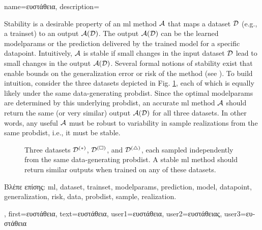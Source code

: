 {name={\foreignlanguage{greek}{ευστάθεια}},
	description={Stability is a desirable property of an \gls{ml} method $\mathcal{A}$ that maps a 
		\gls{dataset} $\mathcal{D}$ (e.g., a \gls{trainset}) to an output $\mathcal{A}(\mathcal{D})$. The output 
		$\mathcal{A}(\mathcal{D})$ can be the learned \gls{modelparams} or the \gls{prediction} delivered 
		by the trained \gls{model} for a specific \gls{datapoint}. Intuitively, $\mathcal{A}$ is 
		stable if small changes in the input \gls{dataset} $\mathcal{D}$ lead to small changes in the 
		output $\mathcal{A}(\mathcal{D})$. Several formal notions of stability exist that enable bounds 
		on the \gls{generalization} error or \gls{risk} of the method (see \cite[Ch.~13]{ShalevMLBook}).
		To build intuition, consider the three \gls{dataset}s depicted in Fig. \ref{fig_three_data_stability_dict}, each 
		of which is equally likely under the same \gls{data}-generating \gls{probdist}. Since the 
		optimal \gls{modelparams} are determined by this underlying \gls{probdist}, an accurate 
		\gls{ml} method $\mathcal{A}$ should return the same (or very similar) output $\mathcal{A}(\mathcal{D})$ 
		for all three \gls{dataset}s. In other words, any useful $\mathcal{A}$ must be robust to 
		variability in \gls{sample} \gls{realization}s from the same \gls{probdist}, i.e., it must be stable. 
		\begin{figure}[H]
			\centering
			\caption{Three \gls{dataset}s $\mathcal{D}^{(*)}$, $\mathcal{D}^{(\square)}$, and $\mathcal{D}^{(\triangle)}$, 
				each sampled independently from the same \gls{data}-generating \gls{probdist}. A stable \gls{ml} 
				method should return similar outputs when trained on any of these \gls{dataset}s. \label{fig_three_data_stability_dict}}
		\end{figure}
		\foreignlanguage{greek}{Βλέπε επίσης:} \gls{ml}, \gls{dataset}, \gls{trainset}, \gls{modelparams}, \gls{prediction}, 
		\gls{model}, \gls{datapoint}, \gls{generalization}, \gls{risk}, \gls{data}, \gls{probdist}, \gls{sample}, \gls{realization}.}, 
	first={\foreignlanguage{greek}{ευστάθεια}}, 
	text={\foreignlanguage{greek}{ευστάθεια}},
	user1={\foreignlanguage{greek}{ευστάθεια}}, %
  	user2={\foreignlanguage{greek}{ευστάθειας}}, %
	user3={\foreignlanguage{greek}{ευστάθεια}} %
}

